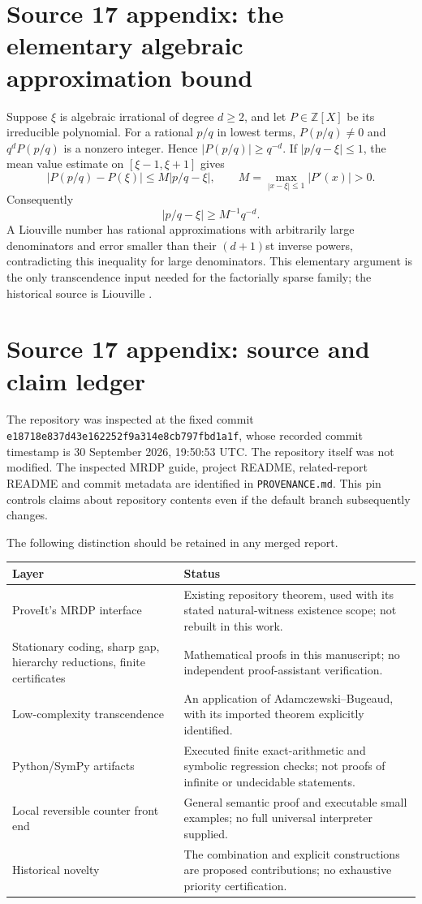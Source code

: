 \documentclass[11pt,letterpaper]{article}
\numberwithin{equation}{section}
\theoremstyle{definition}
\theoremstyle{remark}
\newcommand{\Z}{\mathbb Z}
\newcommand{\code}[1]{\nolinkurl{#1}}
\newcommand{\pin}{{\small\texttt{e18718e837d43e162252f9a314e8cb797fbd1a1f}}}
\begin{document}
\section{Source 17 appendix: the elementary algebraic approximation bound}
\label{pqc:rv:app:liouville}
Suppose $\xi$ is algebraic irrational of degree $d\geq2$, and let
$P\in\Z[X]$ be its irreducible polynomial. For a rational $p/q$ in
lowest terms, $P(p/q)\ne0$ and $q^dP(p/q)$ is a nonzero integer.
Hence $|P(p/q)|\geq q^{-d}$. If $|p/q-\xi|\leq1$, the mean value
estimate on $[\xi-1,\xi+1]$ gives
\[
 |P(p/q)-P(\xi)|\leq M|p/q-\xi|,
 \qquad M=\max_{|x-\xi|\leq1}|P'(x)|>0.
\]
Consequently
\[
 |p/q-\xi|\geq M^{-1}q^{-d}.
\]
A Liouville number has rational approximations with arbitrarily large
denominators and error smaller than their $(d+1)$st inverse powers,
contradicting this inequality for large denominators. This elementary
argument is the only transcendence input needed for the factorially
sparse family; the historical source is Liouville \cite{b62s17-liouville}.

\section{Source 17 appendix: source and claim ledger}
\label{pqc:rv:app:ledger}
The repository was inspected at the fixed commit \pin, whose recorded
commit timestamp is 30 September 2026, 19:50:53 UTC. The repository
itself was not modified. The inspected MRDP guide, project README,
related-report README and commit metadata are identified in
\code{PROVENANCE.md}. This pin controls claims about repository
contents even if the default branch subsequently changes.

The following distinction should be retained in any merged report.
\begin{center}
\begin{tabularx}{\textwidth}{@{}>{\raggedright\arraybackslash}p{}X@{}}
\toprule
Layer & Status \\
\midrule
ProveIt's MRDP interface & Existing repository theorem, used with its
stated natural-witness existence scope; not rebuilt in this work. \\
Stationary coding, sharp gap, hierarchy reductions, finite certificates &
Mathematical proofs in this manuscript; no independent proof-assistant
verification. \\
Low-complexity transcendence & An application of Adamczewski--Bugeaud,
with its imported theorem explicitly identified. \\
Python/SymPy artifacts & Executed finite exact-arithmetic and symbolic
regression checks; not proofs of infinite or undecidable statements. \\
Local reversible counter front end & General semantic proof and executable
small examples; no full universal interpreter supplied. \\
Historical novelty & The combination and explicit constructions are
proposed contributions; no exhaustive priority certification. \\
\bottomrule
\end{tabularx}
\end{center}
\end{document}
